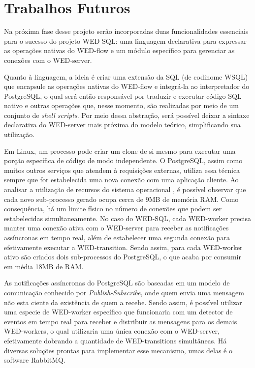\documentclass[conference]{IEEEtran}
\begin{document}

\section{Trabalhos Futuros}

Na próxima fase desse projeto serão incorporadas duas funcionalidades essenciais para o sucesso do projeto WED-SQL: uma
linguagem declarativa para expressar as operações nativas do WED-flow e um módulo específico para gerenciar as conexões
com o WED-server.
\par Quanto à linguagem, a ideia é criar uma extensão da SQL (de codinome WSQL) que encapsule as operações nativas do WED-flow e integrá-la
ao interpretador do PostgreSQL, o qual será então responsável por traduzir e executar código SQL nativo e outras operações que,
nesse momento, são realizadas por meio de um conjunto de \emph{shell scripts}. Por meio dessa abstração, será possível 
deixar a sintaxe declarativa do WED-server mais próxima do modelo teórico, simplificando sua utilização.
\par Em Linux, um processo pode criar um clone de si mesmo para executar uma porção específica de código de modo independente.
O PostgreSQL, assim como muitos outros serviços que atendem à requisições externas, utiliza essa técnica sempre que 
for estabelecida uma nova conexão com uma aplicação cliente. Ao analisar a utilização de recursos do sistema operacional
, é possível observar que cada novo sub-processo gerado ocupa cerca de 9MB de memória RAM. Como consequência, há um limite
físico no número de conexões que podem ser estabelecidas simultaneamente. No caso do WED-SQL, cada WED-worker precisa 
manter uma conexão ativa com o WED-server para receber as notificações
assíncronas em tempo real, além de estabelecer uma segunda conexão para efetivamente executar a WED-transition. Sendo
assim, para cada WED-worker ativo são criados dois sub-processos do PostgreSQL, o que acaba por consumir em média 18MB
de RAM.
\par As notificações assíncronas do PostgreSQL são baseadas em um modelo de comunicação conhecido por \emph{Publish-Subscribe},
onde quem envia uma mensagem não esta ciente da existência de quem a recebe. Sendo assim, é possível utilizar uma especie
de WED-worker específico que funcionaria com um detector de eventos em tempo real para receber e distribuir as mensagens
para os demais WED-workers, o qual utilizaria uma única conexão com o WED-server, efetivamente dobrando a quantidade
de WED-transitions simultâneas. Há diversas soluções prontas para implementar esse mecanismo, umas delas é o software 
RabbitMQ.
\end{document}
